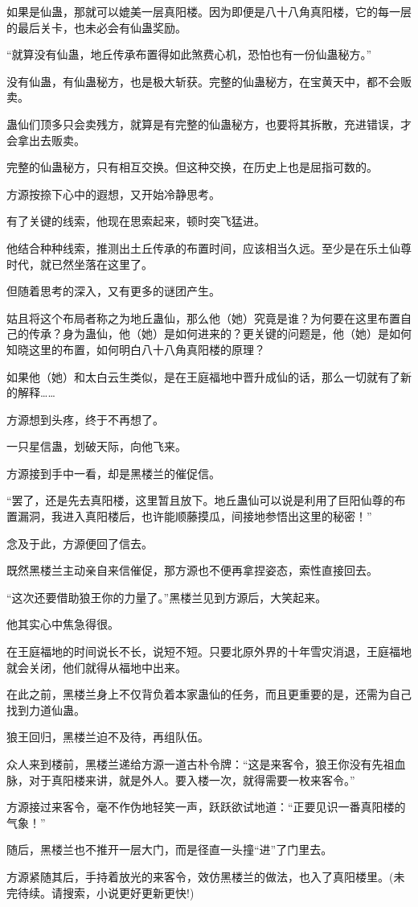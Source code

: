 \begin{this_body}
如果是仙蛊，那就可以媲美一层真阳楼。因为即便是八十八角真阳楼，它的每一层的最后关卡，也未必会有仙蛊奖励。

“就算没有仙蛊，地丘传承布置得如此煞费心机，恐怕也有一份仙蛊秘方。”

没有仙蛊，有仙蛊秘方，也是极大斩获。完整的仙蛊秘方，在宝黄天中，都不会贩卖。

蛊仙们顶多只会卖残方，就算是有完整的仙蛊秘方，也要将其拆散，充进错误，才会拿出去贩卖。

完整的仙蛊秘方，只有相互交换。但这种交换，在历史上也是屈指可数的。

方源按捺下心中的遐想，又开始冷静思考。

有了关键的线索，他现在思索起来，顿时突飞猛进。

他结合种种线索，推测出土丘传承的布置时间，应该相当久远。至少是在乐土仙尊时代，就已然坐落在这里了。

但随着思考的深入，又有更多的谜团产生。

姑且将这个布局者称之为地丘蛊仙，那么他（她）究竟是谁？为何要在这里布置自己的传承？身为蛊仙，他（她）是如何进来的？更关键的问题是，他（她）是如何知晓这里的布置，如何明白八十八角真阳楼的原理？

如果他（她）和太白云生类似，是在王庭福地中晋升成仙的话，那么一切就有了新的解释……

方源想到头疼，终于不再想了。

一只星信蛊，划破天际，向他飞来。

方源接到手中一看，却是黑楼兰的催促信。

“罢了，还是先去真阳楼，这里暂且放下。地丘蛊仙可以说是利用了巨阳仙尊的布置漏洞，我进入真阳楼后，也许能顺藤摸瓜，间接地参悟出这里的秘密！”

念及于此，方源便回了信去。

既然黑楼兰主动亲自来信催促，那方源也不便再拿捏姿态，索性直接回去。

“这次还要借助狼王你的力量了。”黑楼兰见到方源后，大笑起来。

他其实心中焦急得很。

在王庭福地的时间说长不长，说短不短。只要北原外界的十年雪灾消退，王庭福地就会关闭，他们就得从福地中出来。

在此之前，黑楼兰身上不仅背负着本家蛊仙的任务，而且更重要的是，还需为自己找到力道仙蛊。

狼王回归，黑楼兰迫不及待，再组队伍。

众人来到楼前，黑楼兰递给方源一道古朴令牌：“这是来客令，狼王你没有先祖血脉，对于真阳楼来讲，就是外人。要入楼一次，就得需要一枚来客令。”

方源接过来客令，毫不作伪地轻笑一声，跃跃欲试地道：“正要见识一番真阳楼的气象！”

随后，黑楼兰也不推开一层大门，而是径直一头撞“进”了门里去。

方源紧随其后，手持着放光的来客令，效仿黑楼兰的做法，也入了真阳楼里。(未完待续。请搜索，小说更好更新更快!)

\end{this_body}

